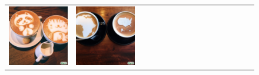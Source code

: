 \begin{figure}[ht!]
\begin{adjustwidth}{-0.8in}{-0.5in}
\begin{tabular}{cccccccccccccccccccc}
\multicolumn{3}{c}{\includegraphics[width=\twobytwocolwidth\textwidth]{figures/cherries/latte_2.jpg}} &
\multicolumn{3}{c}{\includegraphics[width=\twobytwocolwidth\textwidth]{figures/cherries/latte_3.jpg}} \\

\end{tabular}
\end{adjustwidth}
\end{figure}
